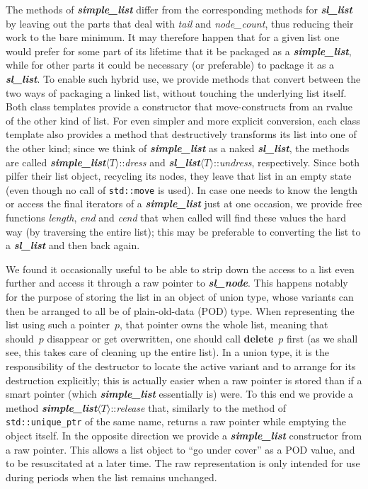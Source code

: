 \documentclass[12pt]{article}
\theoremstyle{plain}
\theoremstyle{definition}
\newcommand\std[1]{\texttt{std::#1}}
\def\slnd.{\textbf{\textit{sl\_\!node}}}
\def\slls.{\textbf{\textit{sl\_\!list}}}
\def\smpl.{\textbf{\textit{simple\_\!list}}}
\def\ang#1{\langle#1\rangle}
\def\atT{$\ang T$::}
\begin{document}
The methods of \smpl. differ from the corresponding methods for \slls. by
leaving out the parts that deal with \textit{tail} and \textit{node\_count},
thus reducing their work to the bare minimum. It may therefore happen that for a
given list one would prefer for some part of its lifetime that it be packaged as
a \smpl., while for other parts it could be necessary (or preferable) to package
it as a \slls.. To enable such hybrid use, we provide methods that convert
between the two ways of packaging a linked list, without touching the underlying
list itself. Both class templates provide a constructor that move-constructs
from an rvalue of the other kind of list. For even simpler and more explicit
conversion, each class template also provides a method that destructively
transforms its list into one of the other kind; since we think of \smpl. as a
naked \slls., the methods are called \smpl.\atT\textit{dress} and
\slls.\atT\textit{undress}, respectively. Since both pilfer their list object,
recycling its nodes, they leave that list in an empty state (even though no call
of \std{move} is used). In case one needs to know the length or access the final
iterators of a \smpl. just at one occasion, we provide free functions
\textit{length}, \textit{end} and \textit{cend} that when called will find these
values the hard way (by traversing the entire list); this may be preferable to
converting the list to a \slls. and then back again.

We found it occasionally useful to be able to strip down the access to a list
even further and access it through a raw pointer to \slnd.. This happens notably
for the purpose of storing the list in an object of union type, whose variants
can then be arranged to all be of plain-old-data (POD) type. When representing
the list using such a pointer~$p$, that pointer owns the whole list, meaning
that should~$p$ disappear or get overwritten, one should call
\textbf{delete}~$p$ first (as we shall see, this takes care of cleaning up the
entire list). In a union type, it is the responsibility of the destructor to
locate the active variant and to arrange for its destruction explicitly; this is
actually easier when a raw pointer is stored than if a smart pointer (which
\smpl. essentially is) were. To this end we provide a method
\smpl.\atT\textit{release} that, similarly to the method of \std{unique\_\!ptr}
of the same name, returns a raw pointer while emptying the object itself. In the
opposite direction we provide a \smpl. constructor from a raw pointer. This
allows a list object to ``go under cover'' as a POD value, and to be
resuscitated at a later time. The raw representation is only intended for use
during periods when the list remains unchanged.
\end{document}
